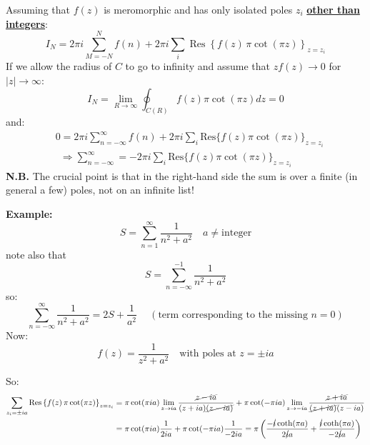 \documentclass{article}
\begin{document}
\noindent
Assuming that $f(z)$ is meromorphic and has only isolated poles $z_i$ \underline{\textbf{other than integers}}:
\begin{equation}
    I_{N} = 2\pi i \sum_{M=-N}^{N} f(n) + 2\pi i \sum_{i} \operatorname{Res} \left\{ f(z)\, \pi \cot(\pi z) \right\}_{z = z_i}
\end{equation}
If we allow the radius of $C$ to go to infinity and assume that $zf(z) \rightarrow 0$ for $|z| \rightarrow \infty$:
\begin{equation}
    I_N = \lim_{R\rightarrow \infty} \oint_{C(R)} f(z) \pi  \cot (\pi z) dz = 0
\end{equation}
and:
\begin{align}
    &0 = 2\pi i \sum_{n=-\infty}^{\infty} f(n) + 2\pi i \sum_i \text{Res} \{ f(z) \pi \cot (\pi z) \}_{z=z_i}\\
    & \ \  \Rightarrow \sum_{n = -\infty}^{\infty} = -2 \pi i  \sum_i \text{Res} \{ f(z) \pi \cot (\pi z) \} _{z=z_i}
\end{align}
\textbf{N.B.} The crucial point is that in the right-hand side the sum is over a finite (in general a few) poles, not on an infinite list!

\vspace{3mm}\noindent
\textbf{Example:}
\begin{equation}
    S = \sum_{n=1}^\infty \frac{1}{n^2 + a^2} \quad a\neq \text{integer}
\end{equation}
note also that
\begin{equation}
    S  = \sum_{n = -\infty}^{-1} \frac{1}{n^2 + a^2}
\end{equation}
so:
\begin{equation}
    \sum_{n = -\infty}^{\infty} \frac{1}{n^2 + a^2} = 2S + \frac{1}{a^2}\ \quad (\text{term corresponding to the missing $n=0$})
\end{equation}
Now:
\begin{equation}
    f(z) = \frac{1}{z^2 + a^2} \quad \text{with poles at $z = \pm ia$}
\end{equation}

\newpage

\noindent
So:
\begin{align*}
    \sum_{z_i = \pm i a} \operatorname{Res} \left\{ f(z)\, \pi \cot(\pi z) \right\}_{z = z_i} &= \pi \cot(\pi i a) \lim_{z \to i a} \frac{\cancel{z - i a}}{(z + i a)\cancel{(z - i a)}} 
+ \pi \cot(-\pi i a) \lim_{z \to -i a} \frac{\cancel{z + i a}}{\cancel{(z + i a)}(z - i a)}\\
&=\pi \cot(\pi i a) \frac{1}{2 i a} + \pi \cot(-\pi i a) \frac{1}{-2 i a} 
= \pi \left( \frac{-\cancel{i} \coth(\pi a)}{2 \cancel{i} a} + \frac{\cancel{i} \coth(\pi a)}{-2 \cancel{i} a} \right)
\end{align*}
\end{document}
